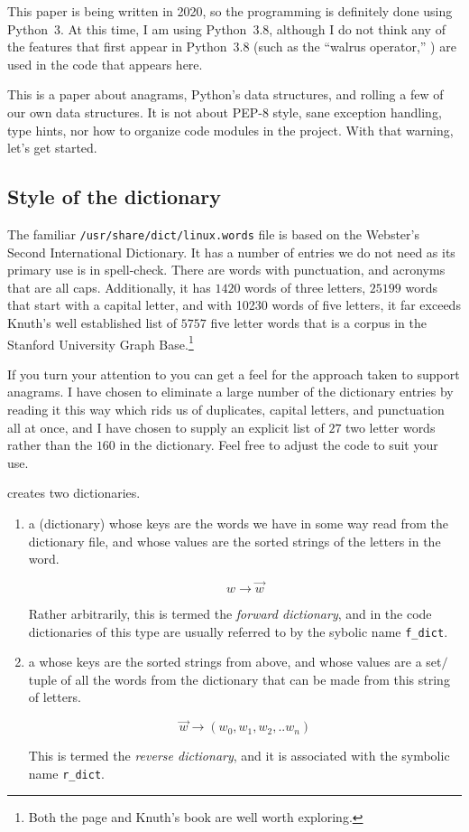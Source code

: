 \documentclass[letterpaper, 11pt]{article}
\begin{document}
This paper is being written in 2020, so the programming is definitely
done using Python~3. At this time, I am using Python~3.8, although
I do not think any of the features that first appear in Python~3.8
(such as the ``walrus operator,'' \lit{:=} ) are used in the code
that appears here.

This is a paper about anagrams, Python's data structures, and rolling
a few of our own data structures. It is not about PEP-8 style, sane
exception handling, type hints, nor how to organize code modules
in the project. With that warning, let's get started.

\subsection{Style of the dictionary}

The familiar \verb|/usr/share/dict/linux.words| file is based on the
Webster's Second International Dictionary. It has a number
of entries we do not need as its primary use is in spell-check. 
There are words with punctuation, and
acronyms that are all caps. Additionally, it has $1420$ words of three
letters, $25199$ words that start with a capital letter, and with 10230
words of five letters, it far exceeds Knuth's well established list
of $5757$ five letter words that is a corpus in the Stanford University
Graph Base.\footnote{
Both the page and Knuth's book are well worth exploring.}

If you turn your attention to  you can get a
feel for the approach taken to support anagrams. I have chosen to
eliminate a large number of the dictionary entries by reading it
this way which rids us of duplicates, capital letters, and punctuation
all at once, and I have chosen to supply an explicit list of $27$
two letter words rather than the $160$ in the dictionary. Feel
free to adjust the code to suit your use.

 creates two dictionaries.

\begin{enumerate}
\item a  (dictionary) whose keys are the words we have
in some way read from the dictionary file, and whose values are the
sorted strings of the letters in the word.

$$w \longrightarrow \overrightarrow{w}$$

Rather arbitrarily, this is termed the \emph{forward dictionary},
and in the code dictionaries of this type are usually referred
to by the sybolic name \verb|f_dict|.

\item a  whose keys are the sorted strings from above,
and whose values are a set$\slash$tuple of all the words from the
dictionary that can be made from this string of letters.

$$\overrightarrow{w} \longrightarrow (w_0, w_1, w_2, .. w_n)$$

This is termed the \emph{reverse dictionary}, and it is associated
with the symbolic name \verb|r_dict|.

\end{enumerate}
\end{document}
